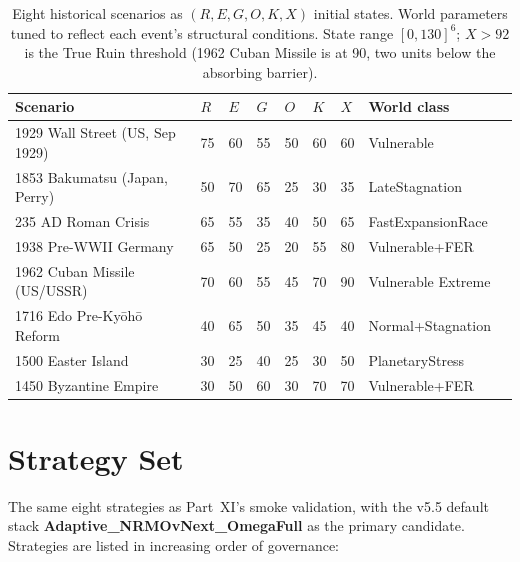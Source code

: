 \begin{table}[ht]
\centering
\scriptsize
\begin{tabularx}{\linewidth}{Xllllllll}
\toprule
\textbf{Scenario} & $R$ & $E$ & $G$ & $O$ & $K$ & $X$ & \textbf{World class} \\
\midrule
1929 Wall Street (US, Sep 1929) & 75 & 60 & 55 & 50 & 60 & 60 & Vulnerable \\
1853 Bakumatsu (Japan, Perry) & 50 & 70 & 65 & 25 & 30 & 35 & LateStagnation \\
235 AD Roman Crisis & 65 & 55 & 35 & 40 & 50 & 65 & FastExpansionRace \\
1938 Pre-WWII Germany & 65 & 50 & 25 & 20 & 55 & 80 & Vulnerable+FER \\
1962 Cuban Missile (US/USSR) & 70 & 60 & 55 & 45 & 70 & 90 & Vulnerable Extreme \\
1716 Edo Pre-Ky\=oh\=o Reform & 40 & 65 & 50 & 35 & 45 & 40 & Normal+Stagnation \\
1500 Easter Island & 30 & 25 & 40 & 25 & 30 & 50 & PlanetaryStress \\
1450 Byzantine Empire & 30 & 50 & 60 & 30 & 70 & 70 & Vulnerable+FER \\
\bottomrule
\end{tabularx}
\caption[Eight historical scenarios]{Eight historical scenarios as
$(R, E, G, O, K, X)$ initial states. World parameters tuned to
reflect each event's structural conditions. State range
$[0, 130]^6$; $X > 92$ is the True Ruin threshold (1962 Cuban
Missile is at 90, two units below the absorbing barrier).}
\label{tab:hist-scenarios}
\end{table}

\section{Strategy Set}
\label{sec:hist-strategies}

The same eight strategies as Part~XI's smoke validation, with the
v5.5 default stack
\textbf{Adaptive\_NRMOvNext\_OmegaFull} as the primary candidate.
Strategies are listed in increasing order of governance:

